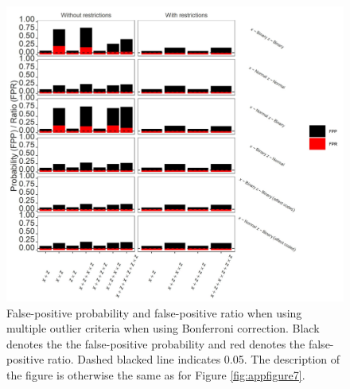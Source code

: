 \begin{figure}[ht!]
\includegraphics[width=1\textwidth]{R/Analysis/Result/Figures/Figure1BSIBon.jpeg}
\centering
\caption{False-positive probability and false-positive ratio when using multiple outlier criteria when using Bonferroni correction. Black denotes the the false-positive probability and red denotes the false-positive ratio. Dashed blacked line indicates 0.05. The description of the figure is otherwise the same as for Figure \ref{fig:appfigure7}.
}
\label{fig:appfigure10}
\end{figure}


